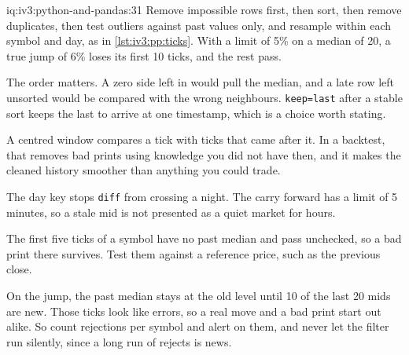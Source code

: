 \begin{solution}{iq:iv3:python-and-pandas:31}
Remove impossible rows first, then sort, then remove duplicates, then test outliers against past values only, and resample within each symbol and day, as in \cref{lst:iv3:pp:ticks}. With a limit of 5\% on a median of 20, a true jump of 6\% loses its first 10 ticks, and the rest pass.
\enlargethispage{-3\baselineskip}%
\label{lst:iv3:pp:ticks}

The order matters. A zero side left in would pull the median, and a late row left unsorted would be compared with the wrong neighbours. \texttt{keep=\textquotesingle last\textquotesingle} after a stable sort keeps the last to arrive at one timestamp, which is a choice worth stating.

A centred window compares a tick with ticks that came after it. In a backtest, that removes bad prints using knowledge you did not have then, and it makes the cleaned history smoother than anything you could trade.

The day key stops \texttt{diff} from crossing a night. The carry forward has a limit of 5 minutes, so a stale mid is not presented as a quiet market for hours.

The first five ticks of a symbol have no past median and pass unchecked, so a bad print there survives. Test them against a reference price, such as the previous close.

On the jump, the past median stays at the old level until 10 of the last 20 mids are new. Those ticks look like errors, so a real move and a bad print start out alike. So count rejections per symbol and alert on them, and never let the filter run silently, since a long run of rejects is news.

\end{solution}

